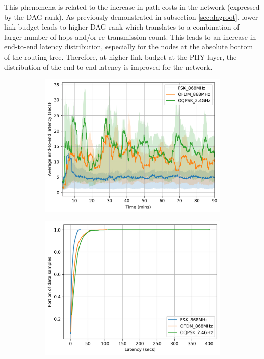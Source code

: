\documentclass[journal,article,submit,moreauthors,pdftex]{Definitions/mdpi}
\begin{document}

This phenomena is related to the increase in path-costs in the network (expressed by the DAG rank).
As previously demonstrated in subsection \ref{sec:dagroot}, lower link-budget leads to higher DAG rank which translates to a combination of larger-number of hops and/or re-transmission count.
This leads to an increase in end-to-end latency distribution, especially for the nodes at the absolute bottom of the routing tree. 
Therefore, at higher link budget at the PHY-layer, the distribution of the end-to-end latency is improved for the network.

\begin{figure}
	\centering
	\begin{subfigure}{0.6\columnwidth}
	\centering
	\includegraphics[width=1\columnwidth]{latency_time}
    \label{fig:latency_time}
	\end{subfigure}
	\begin{subfigure}{0.6\columnwidth}
		\centering
    	\includegraphics[width=01\columnwidth]{latency_cdf}

\end{subfigure}
\end{figure}
\end{document}

